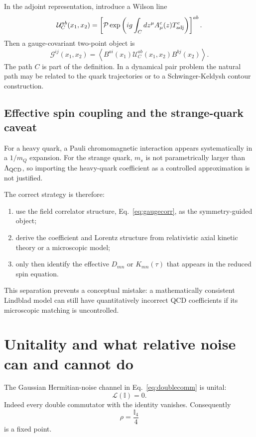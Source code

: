 \documentclass[11pt]{article}
\newcommand{\Id}{\mathbb I}
\begin{document}
In the adjoint representation, introduce a Wilson line
\begin{equation}
\mathcal U^{ab}_{C}(x_1,x_2)
=\left[\mathcal P\exp\left(ig\int_C dz^\mu A_\mu^c(z)T^c_{\rm adj}\right)\right]^{ab}.
\end{equation}
Then a gauge-covariant two-point object is
\begin{equation}
\boxed{
\mathcal G^{ij}(x_1,x_2)
=
\left\langle
B^{ai}(x_1)
\mathcal U^{ab}_{C}(x_1,x_2)
B^{bj}(x_2)
\right\rangle.
}
\label{eq:gaugecorr}
\end{equation}
The path $C$ is part of the definition. In a dynamical pair problem the natural path may be related to the quark trajectories or to a Schwinger-Keldysh contour construction.

\subsection{Effective spin coupling and the strange-quark caveat}

For a heavy quark, a Pauli chromomagnetic interaction appears systematically in a $1/m_Q$ expansion. For the strange quark, $m_s$ is not parametrically larger than $\Lambda_{\rm QCD}$, so importing the heavy-quark coefficient as a controlled approximation is not justified.

The correct strategy is therefore:

\begin{enumerate}[leftmargin=1.6em]
\item use the field correlator structure, Eq.~\eqref{eq:gaugecorr}, as the symmetry-guided object;
\item derive the coefficient and Lorentz structure from relativistic axial kinetic theory or a microscopic model;
\item only then identify the effective $D_{mn}$ or $K_{mn}(\tau)$ that appears in the reduced spin equation.
\end{enumerate}

This separation prevents a conceptual mistake: a mathematically consistent Lindblad model can still have quantitatively incorrect QCD coefficients if its microscopic matching is uncontrolled.

\section{Unitality and what relative noise can and cannot do}

The Gaussian Hermitian-noise channel in Eq.~\eqref{eq:doublecomm} is unital:
\begin{equation}
\mathcal L(\Id)=0.
\end{equation}
Indeed every double commutator with the identity vanishes. Consequently
\begin{equation}
\rho=\frac{\Id_4}{4}
\end{equation}
is a fixed point.
\end{document}
